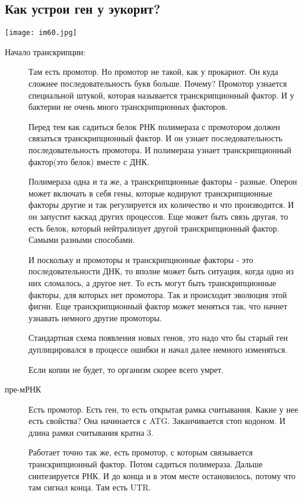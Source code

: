 \subsection{Как устрои ген у эукорит?} 
\texttt{[image: im60.jpg]}
\begin{description}
\item[Начало транскрипции:]
Там есть промотор. Но промотор не такой, как у прокариот. Он 
куда сложнее последовательность букв больше. Почему? Промотор 
узнается специальной штукой, которая называется 
транскрипционный фактор. И у бактерии не очень много транскрипционных 
факторов. 

Перед тем как садиться белок РНК полимераза с промотором
должен связаться транскрипционный фактор. И он узнает последовательность
последовательность промотора. И полимераза узнает
транскрипционный фактор(это белок) вместе с ДНК.

Полимераза одна и та же, а транскрипционные факторы - разные.
Оперон может включать в себя гены, которые кодируют транскрипционные факторы другие и 
так регулируется их количество и что производится. И он запустит каскад других процессов. 
Еще может быть связь другая, то есть белок, который нейтрализует другой транскрипционный фактор. 
Самыми разными способами. 

И поскольку и промоторы и транскрипционные факторы - это 
последовательности ДНК, то вполне может быть ситуация, когда одно из 
них сломалось, а другое нет. То есть могут быть транскрипционные факторы, 
для которых нет промотора. Так и происходит эволюция этой фигни. 
Еще транскрипционный фактор может меняться так, что начнет узнавать 
немного другие промоторы. 

Стандартная схема появления новых генов, это надо что бы старый 
ген дуплицировался в процессе ошибки и начал далее немного изменяться. 

Если копии не будет, то организм скорее всего умрет. 

\item[пре-мРНК]


Есть промотор. Есть ген, то есть открытая рамка считывания. 
Какие у нее есть свойства? 
Она начинается с ATG. Заканчивается стоп кодоном. И длина
рамки считывания кратна 3. 

Работает точно так же, 
есть промотор, с которым связывается транскрипционный фактор. 
Потом садиться полимераза. Дальше синтезируется РНК. И до конца и 
в этом месте остановилось, потому что 
там сигнал конца. 
Там есть UTR. 


\end{description}
